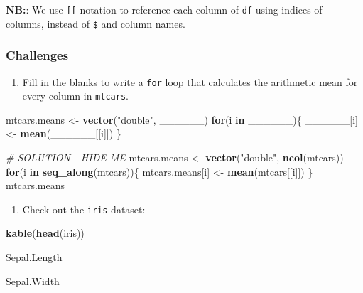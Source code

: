 \documentclass[]{book}
\newenvironment{Shaded}{\begin{snugshade}}{\end{snugshade}}
\newcommand{\KeywordTok}[1]{\textcolor[rgb]{0.13,0.29,0.53}{\textbf{#1}}}
\newcommand{\StringTok}[1]{\textcolor[rgb]{0.31,0.60,0.02}{#1}}
\newcommand{\CommentTok}[1]{\textcolor[rgb]{0.56,0.35,0.01}{\textit{#1}}}
\newcommand{\ControlFlowTok}[1]{\textcolor[rgb]{0.13,0.29,0.53}{\textbf{#1}}}
\newcommand{\NormalTok}[1]{#1}
\providecommand{\tightlist}{%
  \setlength{\itemsep}{0pt}\setlength{\parskip}{0pt}}
\begin{document}
\textbf{NB:}: We use \texttt{{[}{[}} notation to reference each column
of \texttt{df} using indices of columns, instead of \texttt{\$} and
column names.

\subsubsection*{Challenges}\label{challenges-16}

\begin{enumerate}
\def\labelenumi{\arabic{enumi}.}
\tightlist
\item
  Fill in the blanks to write a \texttt{for} loop that calculates the
  arithmetic mean for every column in \texttt{mtcars}.
\end{enumerate}

\begin{Shaded}
\begin{Highlighting}[]
\NormalTok{mtcars.means <-}\StringTok{ }\KeywordTok{vector}\NormalTok{(}\StringTok{"double"}\NormalTok{, ______)}
\ControlFlowTok{for}\NormalTok{(i }\ControlFlowTok{in}\NormalTok{ ______)\{}
\NormalTok{  ______[i] <-}\StringTok{ }\KeywordTok{mean}\NormalTok{(______[[i]])}
\NormalTok{\}}

\CommentTok{# SOLUTION - HIDE ME}
\NormalTok{mtcars.means <-}\StringTok{ }\KeywordTok{vector}\NormalTok{(}\StringTok{"double"}\NormalTok{, }\KeywordTok{ncol}\NormalTok{(mtcars))}
\ControlFlowTok{for}\NormalTok{(i }\ControlFlowTok{in} \KeywordTok{seq_along}\NormalTok{(mtcars))\{}
\NormalTok{  mtcars.means[i] <-}\StringTok{ }\KeywordTok{mean}\NormalTok{(mtcars[[i]])}
\NormalTok{\}}
\NormalTok{mtcars.means}
\end{Highlighting}
\end{Shaded}

\begin{enumerate}
\def\labelenumi{\arabic{enumi}.}
\setcounter{enumi}{1}
\tightlist
\item
  Check out the \texttt{iris} dataset:
\end{enumerate}

\begin{Shaded}
\begin{Highlighting}[]
\KeywordTok{kable}\NormalTok{(}\KeywordTok{head}\NormalTok{(iris))}
\end{Highlighting}
\end{Shaded}

Sepal.Length

Sepal.Width
\end{document}
